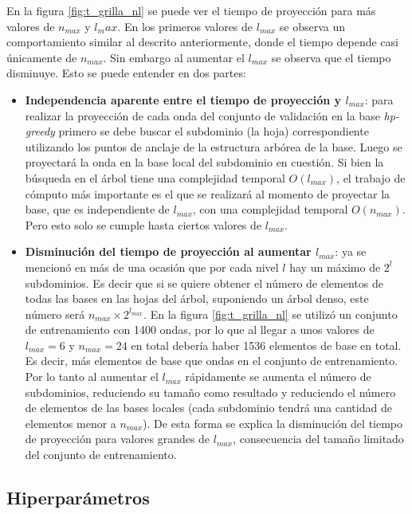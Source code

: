 En la figura \ref{fig:t_grilla_nl} se puede ver el tiempo de proyección para más valores de $n_{max}$ y ${l_max}$. En los primeros valores de $l_{max}$ se observa un comportamiento similar al descrito anteriormente, donde el tiempo depende casi únicamente de $n_{max}$. Sin embargo al aumentar el $l_{max}$ se observa que el tiempo disminuye. Esto se puede entender en dos partes:

\begin{itemize}
\item \textbf{Independencia aparente entre el tiempo de proyección y $l_{max}$}: para realizar la proyección de cada onda del conjunto de validación en la base \textit{hp-greedy} primero se debe buscar el subdominio (la hoja) correspondiente utilizando los puntos de anclaje de la estructura arbórea de la base. Luego se proyectará la onda en la base local del subdominio en cuestión. Si bien la búsqueda en el árbol tiene una complejidad temporal $O(l_{max})$, el trabajo de cómputo más importante es el que se realizará al momento de proyectar la base, que es independiente de $l_{max}$, con una complejidad temporal $O(n_{max})$. Pero esto solo se cumple hasta ciertos valores de $l_{max}$.
\item \textbf{Disminución del tiempo de proyección al aumentar $l_{max}$}: ya se mencionó en más de una ocasión que por cada nivel $l$ hay un máximo de $2^l$ subdominios. Es decir que si se quiere obtener el número de elementos de todas las bases en las hojas del árbol, suponiendo un árbol denso, este número será $n_{max} \times 2^{l_{max}}$. En la figura \ref{fig:t_grilla_nl} se utilizó un conjunto de entrenamiento con 1400 ondas, por lo que al llegar a unos valores de $l_{max} = 6$ y $n_{max} = 24$ en total debería haber 1536 elementos de base en total. Es decir, más elementos de base que ondas en el conjunto de entrenamiento. Por lo tanto al aumentar el $l_{max}$ rápidamente se aumenta el número de subdominios, reduciendo su tamaño como resultado y reduciendo el número de elementos de las bases locales (cada subdominio tendrá una cantidad de elementos menor a $n_{max}$). De esta forma se explica la disminución del tiempo de proyección para valores grandes de $l_{max}$, consecuencia del tamaño limitado del conjunto de entrenamiento.
\end{itemize}


\subsection{Hiperparámetros}


